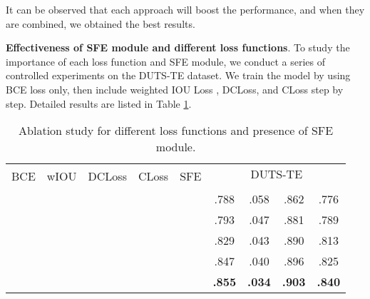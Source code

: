 \documentclass[10pt,twocolumn,letterpaper]{article}
\begin{document}
It can be observed that each approach will boost the performance, and when they are combined, we obtained the best results.

\textbf{Effectiveness of SFE module and different loss functions}. To study the importance of each loss function and SFE module, we conduct a series of controlled experiments on the DUTS-TE dataset. We train the model by using BCE loss only, then include weighted IOU Loss \cite{F3NET}, DCLoss, and CLoss step by step. Detailed results are listed in Table \ref{table:loss_and_sfe}.

\begin{table}[!h]
      \centering
        \setlength\tabcolsep{1.5pt}
	\caption{Ablation study for different loss functions and presence of SFE module.}
        \begin{tabular}{c|c|c|c|c|cccc}
	\hline
	\multirow{2}{*}{BCE} & \multirow{2}{*}{wIOU} & \multirow{2}{*}{DCLoss} & \multirow{2}{*}{CLoss} & \multirow{2}{*}{SFE} & \multicolumn{4}{c}{DUTS-TE}  \\
	                     &                        &                         &                        &                      & \textbf{} & \textbf{} & \textbf{} & \textbf{} \\ 
	\hline
	\cmark &                        &                         &                        &                      &.788              & .058              & .862               & .776 \\
	\cmark & \cmark   &                         &                        &                      &.793              & .047               & .881               & .789 \\
	                     & \cmark   & \cmark    &                        &                      &.829              & .043              & .890               & .813 \\
	                     & \cmark   & \cmark    & \cmark   &                      &.847              & .040               & .896               & .825 \\
	                     & \cmark   & \cmark    & \cmark   & \cmark &\textbf{.855} & \textbf{.034}  & \textbf{.903}  & \textbf{.840} \\
	\hline
	\end{tabular}
	\label{table:loss_and_sfe}
\end{table}
\end{document}
